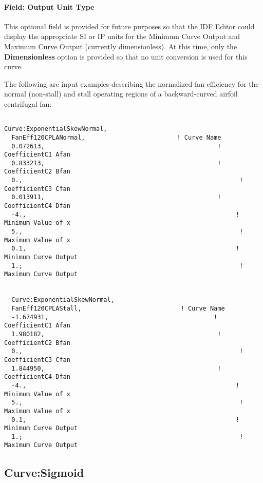 \paragraph{Field: Output Unit Type}\label{field-output-unit-type-11}

This optional field is provided for future purposes so that the IDF Editor could display the appropriate SI or IP units for the Minimum Curve Output and Maximum Curve Output (currently dimensionless). At this time, only the \textbf{Dimensionless} option is provided so that no unit conversion is used for this curve.

The following are input examples describing the normalized fan efficiency for the normal (non-stall) and stall operating regions of a backward-curved airfoil centrifugal fan:

\begin{lstlisting}

Curve:ExponentialSkewNormal,
  FanEff120CPLANormal,                         ! Curve Name
  0.072613,                                               ! CoefficientC1 Afan
  0.833213,                                               ! CoefficientC2 Bfan
  0.,                                                           ! CoefficientC3 Cfan
  0.013911,                                               ! CoefficientC4 Dfan
  -4.,                                                         ! Minimum Value of x
  5.,                                                           ! Maximum Value of x
  0.1,                                                         ! Minimum Curve Output
  1.;                                                           ! Maximum Curve Output


  Curve:ExponentialSkewNormal,
  FanEff120CPLAStall,                           ! Curve Name
  -1.674931,                                             ! CoefficientC1 Afan
  1.980182,                                               ! CoefficientC2 Bfan
  0.,                                                           ! CoefficientC3 Cfan
  1.844950,                                               ! CoefficientC4 Dfan
  -4.,                                                         ! Minimum Value of x
  5.,                                                           ! Maximum Value of x
  0.1,                                                         ! Minimum Curve Output
  1.;                                                           ! Maximum Curve Output
\end{lstlisting}

\subsection{Curve:Sigmoid}\label{curvesigmoid}

